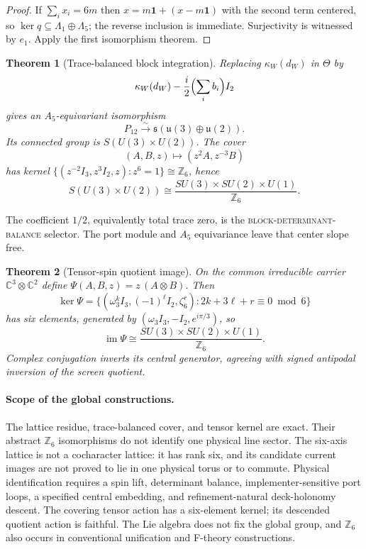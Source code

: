\documentclass[11pt]{article}
\newtheorem{theorem}{Theorem}[section]
\begin{document}
\begin{proof}
If \(\sum_ix_i=6m\) then \(x=m\mathbf1+(x-m\mathbf1)\) with the second term
centered, so \(\ker q\subseteq\Lambda_1\oplus\Lambda_5\); the reverse inclusion
is immediate. Surjectivity is witnessed by \(e_1\). Apply the first isomorphism
theorem.
\end{proof}

\begin{theorem}[Trace-balanced block integration]
Replacing \(\kappa_W(d_W)\) in \(\Theta\) by
\[
 \kappa_W(d_W)-\frac i2\Bigl(\sum_i b_i\Bigr)I_2
\]
gives an \(A_5\)-equivariant isomorphism
\[
 P_{12}\xrightarrow{\sim}
 \mathfrak{s}(\mathfrak u(3)\oplus\mathfrak u(2)).
\]
Its connected group is \(S(U(3)\times U(2))\). The cover
\[
 (A,B,z)\longmapsto(z^2A,z^{-3}B)
\]
has kernel
\(\{(z^{-2}I_3,z^3I_2,z):z^6=1\}\cong\mathbb Z_6\), hence
\[
 S(U(3)\times U(2))\cong
 \frac{SU(3)\times SU(2)\times U(1)}{\mathbb Z_6}.
\]
\end{theorem}

The coefficient \(1/2\), equivalently total trace zero, is the
\textsc{block-determinant-balance} selector. The port module and \(A_5\)
equivariance leave that center slope free.

\begin{theorem}[Tensor-spin quotient image]
On the common irreducible carrier \(\mathbb C^3\otimes\mathbb C^2\) define
\(\Psi(A,B,z)=z\,(A\otimes B)\). Then
\[
  \ker\Psi=\bigl\{(\omega_3^kI_3,(-1)^\ell I_2,\zeta_6^r):
  2k+3\ell+r\equiv0 \bmod 6\bigr\}
\]
has six elements, generated by \((\omega_3I_3,-I_2,e^{i\pi/3})\), so
\[
  \operatorname{im}\Psi\cong
  \frac{SU(3)\times SU(2)\times U(1)}{\mathbb Z_6}.
\]
Complex conjugation inverts its central generator, agreeing with signed
antipodal inversion of the screen quotient.
\end{theorem}

\paragraph{Scope of the global constructions.} The lattice residue,
trace-balanced cover, and tensor kernel are exact. Their abstract
\(\mathbb Z_6\) isomorphisms do not identify one physical line sector. The
six-axis lattice is not a cocharacter lattice: it has rank six, and its
candidate current images are not proved to lie in one physical torus or to
commute. Physical identification requires a spin lift,
determinant balance, implementer-sensitive port loops, a specified central
embedding, and refinement-natural deck-holonomy descent. The covering tensor
action has a six-element kernel; its descended quotient action is faithful.
The Lie algebra does not fix the global group, and \(\mathbb Z_6\) also occurs
in conventional unification and F-theory constructions.
\end{document}
